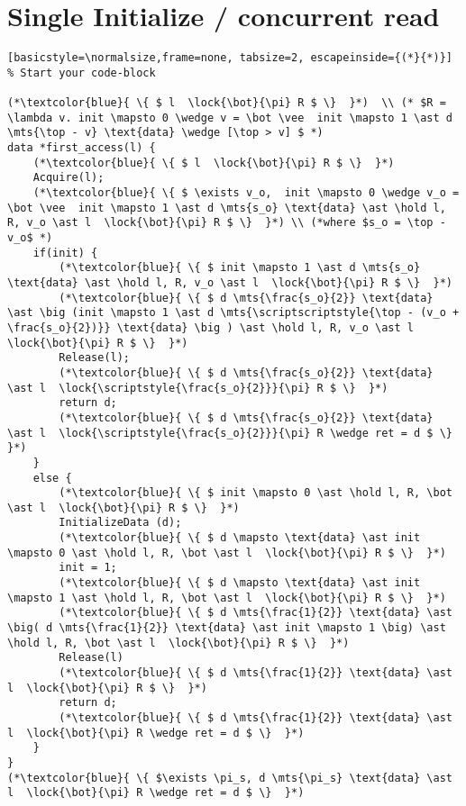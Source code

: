 \documentclass[8pt]{article}
\newcommand{\lock}[2]{ \square \hspace{-1ex} \xrightarrow[#1]{#2}}
\newcommand{\hold}{\text{Hold }}
\newcommand{\mts}[1]{ \overset{#1}{\mapsto} }
\begin{document}
\section{Single Initialize / concurrent read  }
\begin{lstlisting}[basicstyle=\normalsize,frame=none, tabsize=2, escapeinside={(*}{*)}]  % Start your code-block

(*\textcolor{blue}{ \{ $ l  \lock{\bot}{\pi} R $ \}  }*)  \\ (* $R = \lambda v. init \mapsto 0 \wedge v = \bot \vee  init \mapsto 1 \ast d \mts{\top - v} \text{data} \wedge [\top > v] $ *)
data *first_access(l) {
	(*\textcolor{blue}{ \{ $ l  \lock{\bot}{\pi} R $ \}  }*)
	Acquire(l);
	(*\textcolor{blue}{ \{ $ \exists v_o,  init \mapsto 0 \wedge v_o = \bot \vee  init \mapsto 1 \ast d \mts{s_o} \text{data} \ast \hold l, R, v_o \ast l  \lock{\bot}{\pi} R $ \}  }*) \\ (*where $s_o = \top -v_o$ *)
	if(init) {
		(*\textcolor{blue}{ \{ $ init \mapsto 1 \ast d \mts{s_o} \text{data} \ast \hold l, R, v_o \ast l  \lock{\bot}{\pi} R $ \}  }*)
		(*\textcolor{blue}{ \{ $ d \mts{\frac{s_o}{2}} \text{data} \ast \big (init \mapsto 1 \ast d \mts{\scriptscriptstyle{\top - (v_o + \frac{s_o}{2})}} \text{data} \big ) \ast \hold l, R, v_o \ast l  \lock{\bot}{\pi} R $ \}  }*)
		Release(l);
		(*\textcolor{blue}{ \{ $ d \mts{\frac{s_o}{2}} \text{data} \ast l  \lock{\scriptstyle{\frac{s_o}{2}}}{\pi} R $ \}  }*)
		return d;
		(*\textcolor{blue}{ \{ $ d \mts{\frac{s_o}{2}} \text{data} \ast l  \lock{\scriptstyle{\frac{s_o}{2}}}{\pi} R \wedge ret = d $ \}  }*)
	}	
	else {
		(*\textcolor{blue}{ \{ $ init \mapsto 0 \ast \hold l, R, \bot \ast l  \lock{\bot}{\pi} R $ \}  }*)
		InitializeData (d);
		(*\textcolor{blue}{ \{ $ d \mapsto \text{data} \ast init \mapsto 0 \ast \hold l, R, \bot \ast l  \lock{\bot}{\pi} R $ \}  }*)
		init = 1;
		(*\textcolor{blue}{ \{ $ d \mapsto \text{data} \ast init \mapsto 1 \ast \hold l, R, \bot \ast l  \lock{\bot}{\pi} R $ \}  }*)
		(*\textcolor{blue}{ \{ $ d \mts{\frac{1}{2}} \text{data} \ast \big( d \mts{\frac{1}{2}} \text{data} \ast init \mapsto 1 \big) \ast \hold l, R, \bot \ast l  \lock{\bot}{\pi} R $ \}  }*)
		Release(l)
		(*\textcolor{blue}{ \{ $ d \mts{\frac{1}{2}} \text{data} \ast l  \lock{\bot}{\pi} R $ \}  }*)
		return d;
		(*\textcolor{blue}{ \{ $ d \mts{\frac{1}{2}} \text{data} \ast l  \lock{\bot}{\pi} R \wedge ret = d $ \}  }*)
	}
}
(*\textcolor{blue}{ \{ $\exists \pi_s, d \mts{\pi_s} \text{data} \ast l  \lock{\bot}{\pi} R \wedge ret = d $ \}  }*)

\end{lstlisting}
\end{document}
